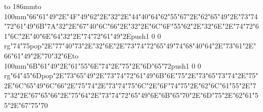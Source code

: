 \hbox to 186mm{\hsize=81mm\vbox to 100mm{\vfill\ipa\char"66\ipa\char"61\ipa\char"49\ipa\char"2E\ipa\char"4F\ipa\char"49\ipa\char"62\ipa\char"2E\ipa\char"32\ipa\char"2E\ipa\char"44\ipa\char"40\ipa\char"64\medskip\ipa\char"62\ipa\char"55\ipa\char"67\ipa\char"2E\ipa\char"62\ipa\char"65\ipa\char"49\ipa\char"2E\ipa\char"73\ipa\char"74\ipa\char"72\ipa\char"61\ipa\char"49\ipa\char"6B\medskip\ipa\char"7A\ipa\char"32\ipa\char"2E\ipa\char"67\ipa\char"40\ipa\char"6C\ipa\char"66\ipa\char"2E\ipa\char"32\ipa\char"2E\ipa\char"6C\ipa\char"6F\ipa\char"55\ipa\char"62\ipa\char"2E\ipa\char"32\ipa\char"6E\ipa\char"2E\ipa\char"74\ipa\char"72\ipa\char"61\ipa\char"6C\ipa\char"2E\ipa\char"40\ipa\char"6E\ipa\char"64\medskip\ipa\char"32\ipa\char"2E\ipa\char"74\ipa\char"72\ipa\char"61\ipa\char"49\ipa\char"2E\pdfcolorstack\match push{1 0 0 rg}\ipa\char"74\ipa\char"75\pdfcolorstack\match pop{}\ipa\char"2E\ipa\char"77\ipa\char"40\ipa\char"73\ipa\char"2E\ipa\char"32\ipa\char"6E\ipa\char"2E\ipa\char"73\ipa\char"74\ipa\char"72\ipa\char"65\ipa\char"49\ipa\char"74\medskip\ipa\char"68\ipa\char"40\ipa\char"64\ipa\char"2E\ipa\char"73\ipa\char"61\ipa\char"2E\ipa\char"66\ipa\char"61\ipa\char"49\ipa\char"2E\ipa\char"70\ipa\char"32\ipa\char"6E\vfill}\hfill\vbox to 100mm{\vfill\ipa\char"6B\ipa\char"61\ipa\char"49\ipa\char"2E\ipa\char"61\ipa\char"55\ipa\char"6E\ipa\char"74\ipa\char"2E\ipa\char"75\ipa\char"2E\ipa\char"6D\ipa\char"65\ipa\char"72\medskip\pdfcolorstack\match push{1 0 0 rg}\ipa\char"64\ipa\char"45\ipa\char"6D\pdfcolorstack\match pop{}\ipa\char"2E\ipa\char"73\ipa\char"65\ipa\char"49\ipa\char"2E\ipa\char"73\ipa\char"74\ipa\char"72\ipa\char"61\ipa\char"49\ipa\char"6B\medskip\ipa\char"6E\ipa\char"75\ipa\char"2E\ipa\char"73\ipa\char"65\ipa\char"73\ipa\char"74\ipa\char"2E\ipa\char"75\ipa\char"2E\ipa\char"6C\ipa\char"65\ipa\char"49\ipa\char"6C\ipa\char"66\ipa\char"2E\ipa\char"75\ipa\char"74\ipa\char"2E\ipa\char"73\ipa\char"74\ipa\char"75\ipa\char"6C\ipa\char"2E\ipa\char"6F\ipa\char"74\medskip\ipa\char"75\ipa\char"2E\ipa\char"62\ipa\char"6C\ipa\char"61\ipa\char"55\ipa\char"2E\ipa\char"77\ipa\char"32\ipa\char"2E\ipa\char"67\ipa\char"65\ipa\char"66\ipa\char"2E\ipa\char"75\ipa\char"64\ipa\char"2E\ipa\char"73\ipa\char"74\ipa\char"72\ipa\char"65\ipa\char"49\ipa\char"6E\medskip\ipa\char"6B\ipa\char"65\ipa\char"70\ipa\char"2E\ipa\char"6D\ipa\char"75\ipa\char"2E\ipa\char"62\ipa\char"61\ipa\char"55\ipa\char"2E\ipa\char"67\ipa\char"75\ipa\char"70\vfill}}\eject
